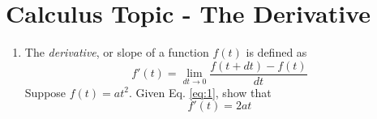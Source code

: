 \documentclass{article}
\begin{document}
\section{Calculus Topic - The Derivative}

\begin{enumerate}
\item The \textit{derivative}, or slope of a function $f(t)$ is defined as 
\begin{equation}
f'(t) = \lim_{dt \to 0} \frac{f(t+dt) - f(t)}{dt} \label{eq:1}
\end{equation}
Suppose $f(t) = a t^2$.  Given Eq. \ref{eq:1}, show that 
\begin{equation}
f'(t) = 2 a t
\end{equation}
\end{enumerate}
\end{document}
